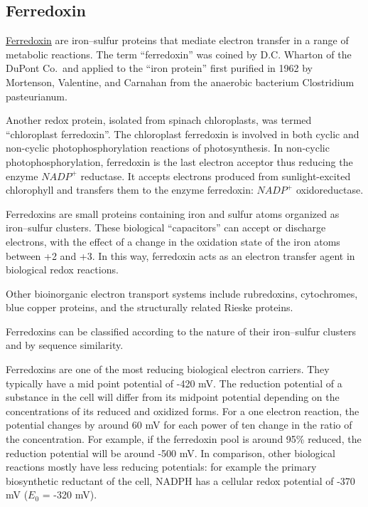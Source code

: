 \documentclass{article}
\begin{document}
\subsection{Ferredoxin}
\href{https://en.wikipedia.org/wiki/Ferredoxin}{Ferredoxin}
are iron–sulfur proteins that mediate electron transfer in a range of metabolic reactions.
The term ``ferredoxin'' was coined by D.C. Wharton of the DuPont Co.\ and applied to the
``iron protein'' first purified in 1962 by Mortenson, Valentine, and Carnahan from the
anaerobic bacterium Clostridium pasteurianum.

Another redox protein, isolated from spinach chloroplasts, was termed ``chloroplast
ferredoxin''. The chloroplast ferredoxin is involved in both cyclic and non-cyclic
photophosphorylation reactions of photosynthesis. In non-cyclic photophosphorylation,
ferredoxin is the last electron acceptor thus reducing the enzyme $NADP^+$ reductase. It
accepts electrons produced from sunlight-excited chlorophyll and transfers them to the
enzyme ferredoxin: $NADP^+$ oxidoreductase.

Ferredoxins are small proteins containing iron and sulfur atoms organized as iron–sulfur
clusters. These biological ``capacitors'' can accept or discharge electrons, with the
effect of a change in the oxidation state of the iron atoms between +2 and +3. In this
way, ferredoxin acts as an electron transfer agent in biological redox reactions.

Other bioinorganic electron transport systems include rubredoxins, cytochromes, blue
copper proteins, and the structurally related Rieske proteins.

Ferredoxins can be classified according to the nature of their iron–sulfur clusters and by
sequence similarity.

Ferredoxins are one of the most reducing biological electron carriers. They typically have
a mid point potential of -420 mV. The reduction potential of a substance in the cell
will differ from its midpoint potential depending on the concentrations of its reduced and
oxidized forms. For a one electron reaction, the potential changes by around 60 mV for
each power of ten change in the ratio of the concentration. For example, if the ferredoxin
pool is around 95\% reduced, the reduction potential will be around -500 mV. In
comparison, other biological reactions mostly have less reducing potentials: for example
the primary biosynthetic reductant of the cell, NADPH has a cellular redox potential of
-370 mV ($E_0$ = -320 mV).
\end{document}
